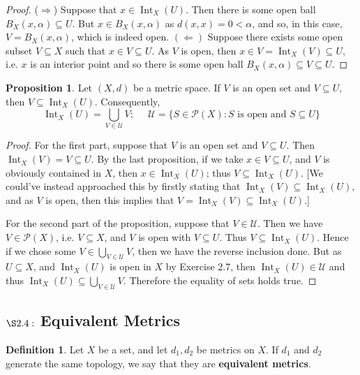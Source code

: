 \documentclass[9pt,reqno]{amsart}
\theoremstyle{definition}
\newtheorem{defi}{Definition}[section]
\newtheorem{prop}{Proposition}[section]
\DeclareMathOperator{\Int}{Int}
\begin{document}
\begin{proof}($\Rightarrow$) Suppose that $x \in \Int_X(U)$. Then there is some open ball $B_X(x, \alpha)\subseteq U$. But $x \in B_X(x,\alpha)$ as $d(x,x) = 0 < \alpha$, and so, in this case, $V = B_X(x,\alpha)$, which is indeed open. $(\Leftarrow)$ Suppose there exists some open subset $V \subseteq X$ such that $x \in V \subseteq U$. As $V$ is open, then $x \in V = \Int_X(V) \subseteq U$, i.e. $x$ is an interior point and so there is some open ball $B_X(x, \alpha ) \subseteq V \subseteq U$.
\end{proof}
\begin{prop}
Let $(X, d)$ be a metric space. If $V$ is an open set and $V \subseteq U$, then $V \subseteq \Int_X(U)$. Consequently, \[ \Int_X(U) = \bigcup _{V \in \mathcal U} V ;  \; \; \; \;\; \mathcal U = \{S \in \mathcal P(X) \colon S \text{ is open and } S \subseteq U \} \]	
\end{prop}
\begin{proof}
	For the first part, suppose that $V$ is an open set and $V \subseteq U$. Then $\Int_X(V) = V \subseteq U$. By the last proposition, if we take $x \in V \subseteq U$, and $V$ is obviously contained in $X$, then $x \in \Int_X(U)$; thus $V \subseteq \Int_X(U)$. [We could've instead approached this by firstly stating that $\Int_X(V) \subseteq \Int_X(U)$, and as $V$ is open, then this implies that $V = \Int_X(V) \subseteq \Int_X(U)$.]
	
	For the second part of the proposition, suppose that $V \in \mathcal U$. Then we have $V \in \mathcal P(X)$, i.e. $V \subseteq X$, and $V$ is open  with $V \subseteq U$. Thus $V \subseteq \Int_X(U)$. Hence if we chose some $V \in \bigcup _{V \in \mathcal U} V$, then we have the reverse inclusion done. But as $U \subseteq X$, and $\Int_X(U)$ is open in $X$ by Exercise 2.7, then $\Int_X(U) \in \mathcal U$ and thus $\Int_X(U) \subseteq \bigcup_{V \in \mathcal U} V$. Therefore the equality of sets holds true. 
\end{proof}
\subsection{$\S 2.4:$ Equivalent Metrics}

\begin{defi}
Let $X$ be a set, and let $d_1, d_2$ be metrics on $X$. If $d_1$ and $d_2$ generate the same topology, we say that they are \textbf{equivalent metrics}. 	
\end{defi}
\end{document}
